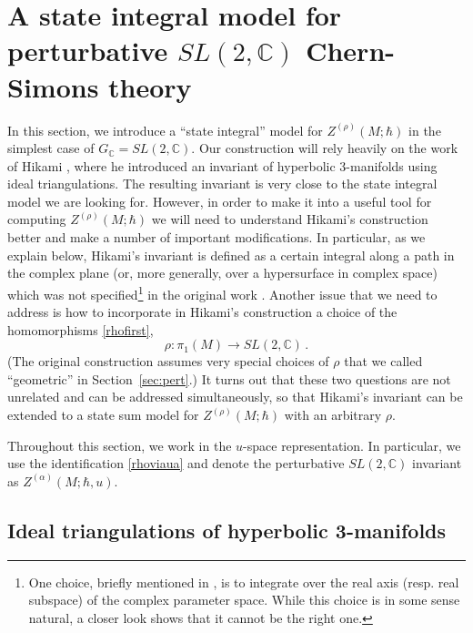 \documentclass[hyper]{JHEP3}
\newcommand{\C}{{\mathbb{C}}}
\newcommand\be{\begin{equation}}
\newcommand\ee{\end{equation}}
\begin{document}
\section{A state integral model for perturbative $SL(2,\C)$ Chern-Simons theory}
\label{sec:statesum}

In this section, we introduce a ``state integral'' model for $Z^{(\rho)} (M;\hbar)$
in the simplest case of $G_{\C} = SL(2,\C)$.
Our construction will rely heavily on the work of Hikami \cite{hikami-2001-16, hikami-2006},
where he introduced an invariant of hyperbolic 3-manifolds using ideal triangulations.
The resulting invariant is very close to the state integral model we are looking for.
However, in order to make it into a useful tool for computing  $Z^{(\rho)} (M;\hbar)$
we will need to understand Hikami's construction better and make a number of important modifications.
In particular, as we explain below, Hikami's invariant is defined as a certain integral
along a path in the complex plane (or, more generally, over a hypersurface in complex space)
which was not specified\footnote{One
choice, briefly mentioned in \cite{hikami-2001-16, hikami-2006}, is to integrate over
the real axis (resp. real subspace) of the complex parameter space.
While this choice is in some sense natural, a closer look shows that it cannot be the right one.}
in the original work \cite{hikami-2001-16, hikami-2006}.
Another issue that we need to address is how to incorporate in Hikami's construction
a choice of the homomorphisms \eqref{rhofirst},
\be
\rho: \pi_1 (M) \to SL(2,\C)\,.
\ee
(The original construction assumes very special choices of $\rho$
that we called ``geometric'' in Section~\ref{sec:pert}.)
It turns out that these two questions are not unrelated and can be addressed
simultaneously, so that Hikami's invariant can be extended to a state sum model
for $Z^{(\rho)} (M;\hbar)$ with an arbitrary $\rho$.

Throughout this section, we work in the $u$-space representation.
In particular, we use the identification \eqref{rhoviaua}
and denote the perturbative $SL(2,\C)$ invariant as $Z^{(\alpha)} (M;\hbar,u)$.


\subsection{Ideal triangulations of hyperbolic 3-manifolds}
\label{sec:ideal}
\end{document}
